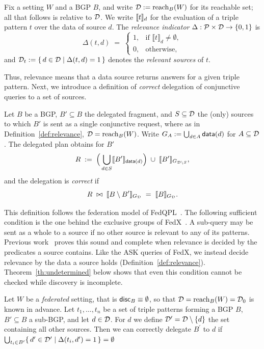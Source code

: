 \begin{definition}
\label{def:relevance}
Fix a setting $W$ and a BGP $B$, and write $\mathcal{D} := \mathrm{reach}_B(W)$ for its reachable set;
all that follows is relative to $\mathcal{D}$. We write $\llbracket t \rrbracket_{d}$ for the evaluation of a
triple pattern $t$ over the data of source $d$. The \emph{relevance indicator}
$\Delta : \mathcal{P} \times \mathcal{D} \to \{0,1\}$ is
\[
  \Delta(t, d) \;=\;
  \begin{cases}
    1, & \text{if } \llbracket t \rrbracket_{d} \neq \emptyset, \\[2pt]
    0, & \text{otherwise,}
  \end{cases}
\]
and $\mathcal{D}_t := \{\, d \in \mathcal{D} \mid \Delta(t,d) = 1 \,\}$ denotes the
\emph{relevant sources} of $t$.
\end{definition}

Thus, relevance means that a data source returns answers for a given triple pattern.
Next, we introduce a definition of \emph{correct} delegation of conjunctive queries to a
set of sources.

\begin{definition}[Delegation]
\label{def:delegation}
Let $B$ be a BGP, $B' \subseteq B$ the delegated fragment, and $S \subseteq \mathcal{D}$ the
(only) sources to which $B'$ is sent as a single conjunctive request, where as in
Definition~\ref{def:relevance}, $\mathcal{D} = \mathrm{reach}_B(W)$. Write
$G_A := \bigcup_{d \in A} \mathsf{data}(d)$ for $A \subseteq \mathcal{D}$. The delegated plan obtains for $B'$
\[
  R \;:=\; \Big( \bigcup_{d \in S} \llbracket B' \rrbracket_{\mathsf{data}(d)} \Big)
           \;\cup\; \llbracket B' \rrbracket_{G_{\mathcal{D} \setminus S}},
\]
and the delegation is \emph{correct} if
\[
  R \;\bowtie\; \llbracket B \setminus B' \rrbracket_{G_{\mathcal{D}}} \;=\; \llbracket B \rrbracket_{G_{\mathcal{D}}} .
\]
\end{definition}

This definition follows the federation model of FedQPL~\cite{cheng2020fedqpl}. The
following sufficient condition is the one behind the exclusive groups of
FedX~\cite{schwarte2011fedx}. A sub-query may be sent as a whole to a source if no other
source is relevant to any of its patterns. Previous work~\cite{stolpe2015logical} proves this sound
and complete when relevance is decided by the predicates a source contains. Like the
\textsf{ASK} queries of FedX, we instead decide relevance by the data a source holds
(Definition~\ref{def:relevance}). Theorem~\ref{th:undetermined} below shows that even
this condition cannot be checked while discovery is incomplete.

\begin{proposition}
  \label{prop:correct-delegation}
    Let $W$ be a \emph{federated} setting, that is $\mathsf{disc}_B \equiv \emptyset$, so that
    $\mathcal{D} = \mathrm{reach}_B(W) = \mathcal{D}_0$ is known in advance.
    Let $t_{1}, \dots, t_{n}$ be a set of triple patterns forming a BGP $B$, 
    $B' \subseteq B$ a sub-BGP, and let $d \in \mathcal{D}$. 
    For $d$ we define $\mathcal{D}^{\prime} = \mathcal{D} \setminus \{d\}$
    the set containing all other sources. 
    Then we can correctly delegate $B^{\prime}$ to $d$ if
    $\bigcup_{t_i \in B^{\prime}}
    \{\, d^{\prime} \in \mathcal{D}^{\prime} \mid \Delta(t_i, d^{\prime}) = 1 \,\} = \emptyset$
\end{proposition}

